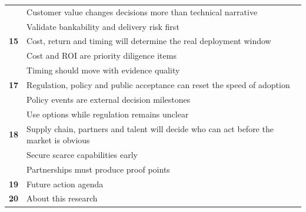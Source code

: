 \documentclass[10pt,a4paper]{article}
\begin{document}
\begin{tabularx}{\linewidth}{p{14mm}Y}
 & {\scriptsize\color{BOMuted} Customer value changes decisions more than technical narrative} \\[1pt]
 & {\scriptsize\color{BOMuted} Validate bankability and delivery risk first} \\[1pt]
\textcolor{BOGreen}{\bfseries 15} & Cost, return and timing will determine the real deployment window \\[5pt]
 & {\scriptsize\color{BOMuted} Cost and ROI are priority diligence items} \\[1pt]
 & {\scriptsize\color{BOMuted} Timing should move with evidence quality} \\[1pt]
\textcolor{BOGreen}{\bfseries 17} & Regulation, policy and public acceptance can reset the speed of adoption \\[5pt]
 & {\scriptsize\color{BOMuted} Policy events are external decision milestones} \\[1pt]
 & {\scriptsize\color{BOMuted} Use options while regulation remains unclear} \\[1pt]
\textcolor{BOGreen}{\bfseries 18} & Supply chain, partners and talent will decide who can act before the market is obvious \\[5pt]
 & {\scriptsize\color{BOMuted} Secure scarce capabilities early} \\[1pt]
 & {\scriptsize\color{BOMuted} Partnerships must produce proof points} \\[1pt]
\textcolor{BOGreen}{\bfseries 19} & Future action agenda \\[5pt]
\textcolor{BOGreen}{\bfseries 20} & About this research \\[5pt]
\end{tabularx}
\clearpage
\end{document}
